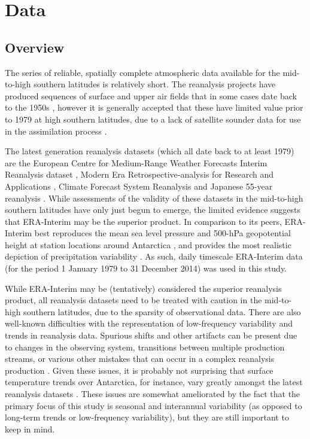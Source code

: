 \section{Data}\label{s:data}

\subsection{Overview}

The series of reliable, spatially complete atmospheric data available for the mid-to-high southern latitudes is relatively short. The reanalysis projects have produced sequences of surface and upper air fields that in some cases date back to the 1950s \citep{Kistler2001,Uppala2005,Kobayashi2015}, however it is generally accepted that these have limited value prior to 1979 at high southern latitudes, due to a lack of satellite sounder data for use in the assimilation process \citep{Hines2000}.

The latest generation reanalysis datasets (which all date back to at least 1979) are the European Centre for Medium-Range Weather Forecasts Interim Reanalysis dataset \citep[ERA-Interim;][]{Dee2011}, Modern Era Retrospective-analysis for Research and Applications \citep[Merra;][]{Rienecker2011}, Climate Forecast System Reanalysis \citep[CFSR;][]{Saha2010} and Japanese 55-year reanalysis \citep[JRA-55;][]{Kobayashi2015}. While assessments of the validity of these datasets in the mid-to-high southern latitudes have only just begun to emerge, the limited evidence suggests that ERA-Interim may be the superior product. In comparison to its peers, ERA-Interim best reproduces the mean sea level pressure and 500-hPa geopotential height at station locations around Antarctica \citep{Bracegirdle2012}, and provides the most realistic depiction of precipitation variability \citep{Bromwich2011,Nicolas2011}. As such, daily timescale ERA-Interim data (for the period 1 January 1979 to 31 December 2014) was used in this study.

While ERA-Interim may be (tentatively) considered the superior reanalysis product, all reanalysis datasets need to be treated with caution in the mid-to-high southern latitudes, due to the sparsity of observational data. There are also well-known difficulties with the representation of low-frequency variability and trends in reanalysis data. Spurious shifts and other artifacts can be present due to changes in the observing system, transitions between multiple production streams, or various other mistakes that can occur in a complex reanalysis production \citep{Dee2014}. Given these issues, it is probably not surprising that surface temperature trends over Antarctica, for instance, vary greatly amongst the latest reanalysis datasets \citep{Nicolas2014}. These issues are somewhat ameliorated by the fact that the primary focus of this study is seasonal and interannual variability (as opposed to long-term trends or low-frequency variability), but they are still important to keep in mind.

